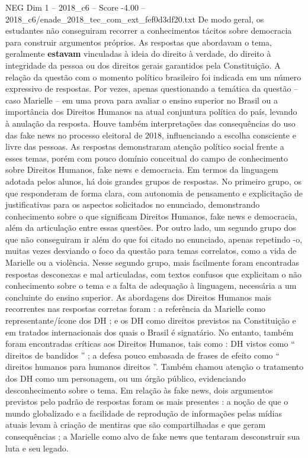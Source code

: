 \begin{textsample}{NEG Dim 1 – 2018\_c6 – Score -4.00 – 2018\_c6/enade\_2018\_tec\_com\_ext\_fef0d3df20.txt}
De modo geral, os estudantes não conseguiram recorrer a conhecimentos tácitos sobre democracia para construir argumentos próprios.
As respostas que abordavam o tema, geralmente \textbf{estavam} vinculadas à ideia do direito à verdade, do direito à integridade da pessoa ou dos direitos gerais garantidos pela Constituição.
A relação da questão com o momento político brasileiro foi indicada em um número expressivo de respostas.
Por vezes, apenas questionando a temática da questão – caso Marielle – em uma prova para avaliar o ensino superior no Brasil ou a importância dos Direitos Humanos na atual conjuntura política do país, levando à anulação da resposta.
Houve também interpretações das consequências do uso das fake news no processo eleitoral de 2018, influenciando a escolha consciente e livre das pessoas.
As respostas demonstraram atenção político social frente a esses temas, porém com pouco domínio conceitual do campo de conhecimento sobre Direitos Humanos, fake news e democracia.
Em termos da linguagem adotada pelos alunos, há dois grandes grupos de respostas.
No primeiro grupo, os que responderam de forma clara, com autonomia de pensamento e explicitação de justificativas para os aspectos solicitados no enunciado, demonstrando conhecimento sobre o que significam Direitos Humanos, fake news e democracia, além da articulação entre essas questões.
Por outro lado, um segundo grupo dos que não conseguiram ir além do que foi citado no enunciado, apenas repetindo -o, muitas vezes desviando o foco da questão para temas correlatos, como a vida de Marielle ou a violência.
Nesse segundo grupo, mais facilmente foram encontradas respostas desconexas e mal articuladas, com textos confusos que explicitam o não conhecimento sobre o tema e a falta de adequação à linguagem, necessária a um concluinte do ensino superior.
As abordagens dos Direitos Humanos mais recorrentes nas respostas corretas foram : a referência da Marielle como representante/ícone dos DH ; e os DH como direitos previstos na Constituição e em tratados internacionais dos quais o Brasil é signatário.
No entanto, também foram encontradas críticas aos Direitos Humanos, tais como : DH vistos como “ direitos de bandidos ” ; a defesa pouco embasada de frases de efeito como “ direitos humanos para humanos direitos ”.
Também chamou atenção o tratamento dos DH como um personagem, ou um órgão público, evidenciando desconhecimento sobre o tema.
Em relação às fake news, dois argumentos previstos pelo padrão de respostas foram os mais presentes : a noção de que o mundo globalizado e a facilidade de reprodução de informações pelas mídias atuais levam à criação de mentiras que são compartilhadas e que geram consequências ; a Marielle como alvo de fake news que tentaram desconstruir sua luta e seu legado.

\end{textsample}
